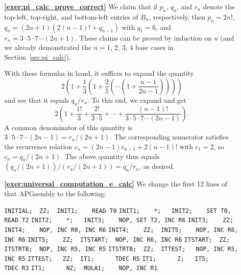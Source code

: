 \begin{multicols}{2}
\begin{itemize}[leftmargin=0em]
	
		\item[\bf\color{ocre}\sffamily\ref{exer:pi_calc_prove_correct}] We claim that if $p_n$, $q_n$, and $r_n$ denote the top-left, top-right, and bottom-left entries of $B_n$, respectively, then $p_n = 2n!$, $q_n = (2n+1)(2(n-1)! + q_{n-1})$ with $q_1 = 6$, and $r_n = 3\cdot 5 \cdot 7 \cdots (2n+1)$. These claims can be proved by induction on $n$ (and we already demonstrated the $n = 1$, $2$, $3$, $4$ base cases in Section~\ref{sec:pi_calc}).
		
		With these formulas in hand, it suffices to expand the quantity
		\[
			2\left(1 + \frac{1}{3}\left( 1 + \frac{2}{5}\left( \cdots \left( 1 + \frac{n-1}{2n-1}\right)\right)\right)\right)
		\]
		and see that it equals $q_n/r_n$. To this end, we expand and get
		\[
			2\left(1 + \frac{1!}{3} + \frac{2!}{3\cdot 5} + \cdots + \frac{(n-1)!}{3\cdot 5\cdot 7\cdots (2n-1)}\right).
		\]
		A common denominator of this quantity is $3 \cdot 5 \cdot 7 \cdots (2n-1) = r_n/(2n+1)$. The corresponding numerator satisfies the recurrence relation $c_n = (2n-1)c_{n-1} + 2(n-1)!$ with $c_1 = 2$, so $c_n = q_n/(2n+1)$. The above quantity thus equals $(q_n/(2n+1))/(r_n/(2n+1)) = q_n/r_n$, as desired.\\
	
		
		\item[\bf\color{ocre}\sffamily\ref{exer:universal_computation_e_calc}] We change the first 12 lines of that APGsembly to the following:
		\begin{center}
			\noindent\begin{minipage}{\linewidth}\scriptsize
				\noindent\verb|INITIAL;  ZZ;  INIT1;    READ T0|
				\verb|INIT1;    *;   INIT2;    SET T0, READ T2|
				\verb|INIT2;    *;   INIT3;    NOP, SET T2, INC R6|
				\verb|INIT3;    ZZ;  INIT4;    NOP, INC R0, INC R6|
				\verb|INIT4;    ZZ;  INIT5;    NOP, INC R6, INC R6|
				\verb|INIT5;    ZZ;  ITSTART;  NOP, INC R6, INC R6|
				\verb|ITSTART;  ZZ;  ITSTRTB;  NOP, INC R5, INC R5|
				\verb|ITSTRTB;  ZZ;  ITTEST;   NOP, INC R5, INC R5|
				\verb|ITTEST;   ZZ;  IT1;      TDEC R5|
				\verb|IT1;      Z;   IT5;      TDEC R3|
				\verb|IT1;      NZ;  MULA1;    NOP, INC R1|
			\end{minipage}
		\end{center}
	\end{itemize}
\end{multicols}



\hypertarget{solutions_self_support_spaceships}{}\label{solutions_self_support_spaceships}
